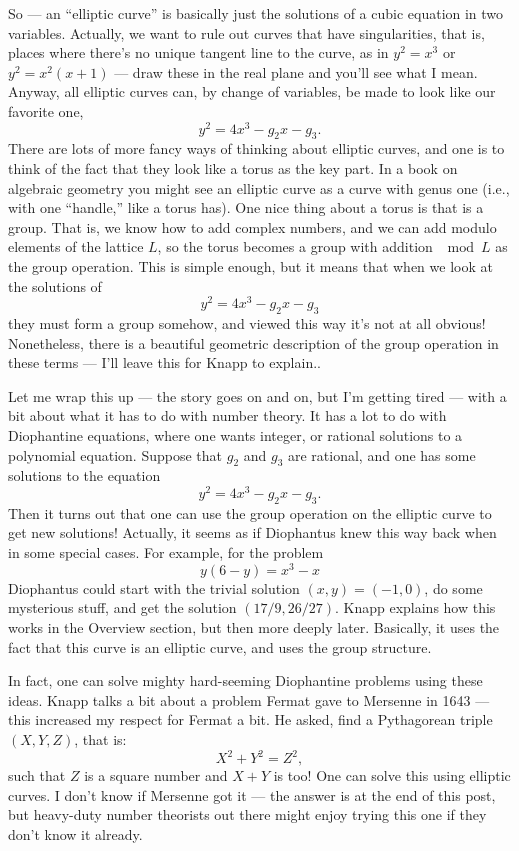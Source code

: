 \documentclass[12pt]{article}
\begin{document}
So --- an ``elliptic curve'' is basically just the solutions of a cubic
equation in two variables. Actually, we want to rule out curves that
have singularities, that is, places where there's no unique tangent line
to the curve, as in \(y^2 = x^3\) or \(y^2 = x^2(x+1)\) --- draw these
in the real plane and you'll see what I mean. Anyway, all elliptic
curves can, by change of variables, be made to look like our favorite
one, \[y^2 = 4x^3 -g_2 x -g_3.\] There are lots of more fancy ways of
thinking about elliptic curves, and one is to think of the fact that
they look like a torus as the key part. In a book on algebraic geometry
you might see an elliptic curve as a curve with genus one (i.e., with
one ``handle,'' like a torus has). One nice thing about a torus is that
is a group. That is, we know how to add complex numbers, and we can add
modulo elements of the lattice \(L\), so the torus becomes a group with
addition \(\mod L\) as the group operation. This is simple enough, but
it means that when we look at the solutions of
\[y^2 = 4x^3 -g_2 x -g_3\] they must form a group somehow, and viewed
this way it's not at all obvious! Nonetheless, there is a beautiful
geometric description of the group operation in these terms --- I'll
leave this for Knapp to explain..

Let me wrap this up --- the story goes on and on, but I'm getting tired
--- with a bit about what it has to do with number theory. It has a lot
to do with Diophantine equations, where one wants integer, or rational
solutions to a polynomial equation. Suppose that \(g_2\) and \(g_3\) are
rational, and one has some solutions to the equation
\[y^2 = 4x^3 - g_2 x - g_3.\] 
Then it turns out that one can use the
group operation on the elliptic curve to get new solutions! Actually, it
seems as if Diophantus knew this way back when in some special cases.
For example, for the problem \[y(6 -y) = x^3 -x\] Diophantus could start
with the trivial solution \((x,y) = (-1,0)\), do some mysterious stuff,
and get the solution \((17/9,26/27)\). Knapp explains how this works in
the Overview section, but then more deeply later. Basically, it uses the
fact that this curve is an elliptic curve, and uses the group structure.

In fact, one can solve mighty hard-seeming Diophantine problems using
these ideas. Knapp talks a bit about a problem Fermat gave to Mersenne
in 1643 --- this increased my respect for Fermat a bit. He asked, find a
Pythagorean triple \((X,Y,Z)\), that is: 
\[X^2 + Y^2 = Z^2,\]
such that \(Z\) is a square number and \(X + Y\) is too! One can solve
this using elliptic curves. I don't know if Mersenne got it --- the
answer is at the end of this post, but heavy-duty number theorists out
there might enjoy trying this one if they don't know it already.
\end{document}
